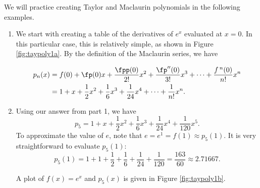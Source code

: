We will practice creating Taylor and Maclaurin polynomials in the following examples.\\

{\begin{enumerate}
\item We start with creating a table of the derivatives of $e^x$ evaluated at $x=0$. In this particular case, this is relatively simple, as shown in Figure \ref{fig:taypoly1a}.
By the definition of the Maclaurin series, we have 

\begin{align*}
p_n(x) &= f(0) + \fp(0)x + \frac{\fpp(0)}{2!}x^2+\frac{\fp''(0)}{3!}x^3+\cdots+\frac{f\,^n(0)}{n!}x^n\\
			&= 1+x+\frac{1}{2}x^2+\frac{1}{6}x^3 + \frac{1}{24}x^4 + \cdots + \frac{1}{n!}x^n.
\end{align*}

\item	Using our answer from part 1, we have $$p_5 = 1+x+\frac{1}{2}x^2+\frac{1}{6}x^3 + \frac{1}{24}x^4 + \frac{1}{120}x^5.$$ To approximate the value of $e$, note that $e = e^1 = f(1) \approx p_5(1).$ It is very straightforward to evaluate $p_5(1)$:
$$p_5(1) = 1+1+\frac12+\frac16+\frac1{24}+\frac1{120} = \frac{163}{60} \approx 2.71667.$$

A plot of $f(x)=e^x$ and $p_5(x)$ is given in Figure \ref{fig:taypoly1b}.
\end{enumerate}
\baselineskip
}\\

